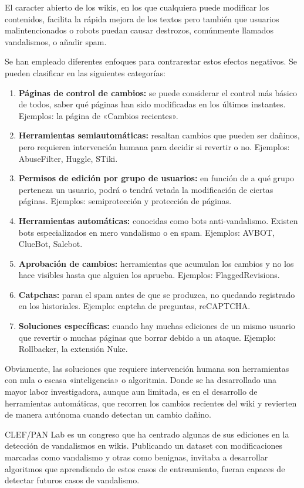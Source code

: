 \documentclass[11pt,onecolumn]{article}
\begin{document}
El caracter abierto de los wikis, en los que cualquiera puede modificar los contenidos, facilita la rápida mejora de los textos pero también que usuarios malintencionados o robots puedan causar destrozos, comúnmente llamados vandalismos, o añadir spam.

Se han empleado diferentes enfoques para contrarestar estos efectos negativos. Se pueden clasificar en las siguientes categorías:
\begin{enumerate}
\item \textbf{Páginas de control de cambios:} se puede considerar el control más básico de todos, saber qué páginas han sido modificadas en los últimos instantes. Ejemplos: la página de «Cambios recientes».
\item \textbf{Herramientas semiautomáticas:} resaltan cambios que pueden ser dañinos, pero requieren intervención humana para decidir si revertir o no. Ejemplos: AbuseFilter, Huggle, STiki.
\item \textbf{Permisos de edición por grupo de usuarios:} en función de a qué grupo perteneza un usuario, podrá o tendrá vetada la modificación de ciertas páginas. Ejemplos: semiprotección y protección de páginas.
\item \textbf{Herramientas automáticas:} conocidas como bots anti-vandalismo. Existen bots especializados en mero vandalismo o en spam. Ejemplos: AVBOT, ClueBot, Salebot.
\item \textbf{Aprobación de cambios:} herramientas que acumulan los cambios y no los hace visibles hasta que alguien los aprueba. Ejemplos: FlaggedRevisions.
\item \textbf{Catpchas:} paran el spam antes de que se produzca, no quedando registrado en los historiales. Ejemplo: captcha de preguntas, reCAPTCHA.
\item \textbf{Soluciones específicas:} cuando hay muchas ediciones de un mismo usuario que revertir o muchas páginas que borrar debido a un ataque. Ejemplo: Rollbacker, la extensión Nuke.
\end{enumerate}

Obviamente, las soluciones que requiere intervención humana son herramientas con nula o escasa «inteligencia» o algoritmia. Donde se ha desarrollado una mayor labor investigadora, aunque aun limitada, es en el desarrollo de herramientas automáticas, que recorren los cambios recientes del wiki y revierten de manera autónoma cuando detectan un cambio dañino.

CLEF/PAN Lab es un congreso que ha centrado algunas de sus ediciones en la detección de vandalismos en wikis. Publicando un dataset con modificaciones marcadas como vandalismo y otras como benignas, invitaba a desarrollar algoritmos que aprendiendo de estos casos de entreamiento, fueran capaces de detectar futuros casos de vandalismo.
\end{document}
